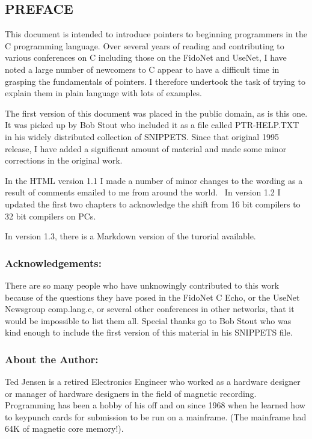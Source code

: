 \hypertarget{preface}{%
\subsection{PREFACE}\label{preface}}

This document is intended to introduce pointers to beginning programmers
in the C programming language. Over several years of reading and
contributing to various conferences on C including those on the FidoNet
and UseNet, I have noted a large number of newcomers to C appear to have
a difficult time in grasping the fundamentals of pointers. I therefore
undertook the task of trying to explain them in plain language with lots
of examples.

The first version of this document was placed in the public domain, as
is this one. It was picked up by Bob Stout who included it as a file
called PTR-HELP.TXT in his widely distributed collection of SNIPPETS.
Since that original 1995 release, I have added a significant amount of
material and made some minor corrections in the original work.

In the HTML version 1.1 I made a number of minor changes to the wording
as a result of comments emailed to me from around the world.~ In version
1.2 I updated the first two chapters to acknowledge the shift from 16
bit compilers to 32 bit compilers on PCs.

In version 1.3, there is a Markdown version of the turorial available.

\hypertarget{acknowledgements}{%
\subsubsection{Acknowledgements:}\label{acknowledgements}}

There are so many people who have unknowingly contributed to this work
because of the questions they have posed in the FidoNet C Echo, or the
UseNet Newsgroup comp.lang.c, or several other conferences in other
networks, that it would be impossible to list them all. Special thanks
go to Bob Stout who was kind enough to include the first version of this
material in his SNIPPETS file.

\hypertarget{about-the-author}{%
\subsubsection{About the Author:}\label{about-the-author}}

Ted Jensen is a retired Electronics Engineer who worked as a hardware
designer or manager of hardware designers in the field of magnetic
recording. Programming has been a hobby of his off and on since 1968
when he learned how to keypunch cards for submission to be run on a
mainframe. (The mainframe had 64K of magnetic core memory!).

